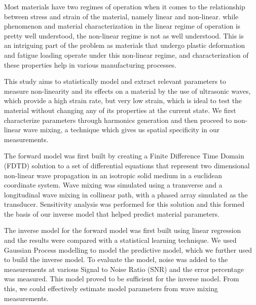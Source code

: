 Most materials have two regimes of operation when it comes to the relationship between stress and strain of the material, namely linear and non-linear. while phenomenon and material characterization in the linear regime of operation is pretty well understood, the non-linear regime is not as well understood. This is an intriguing part of the problem as materials that undergo plastic deformation and fatigue loading operate under this non-linear regime, and characterization of these properties help in various manufacturing processes.

This study aims to statistically model and extract relevant parameters to measure non-linearity and its effects on a material by the use of ultrasonic waves, which provide a high strain rate, but very low strain, which is ideal to test the material without changing any of its properties at the current state. We first characterize parameters through harmonics generation and then proceed to non-linear wave mixing, a technique which gives us spatial specificity in our measurements. 

The forward model was first built by creating a Finite Difference Time Domain (FDTD) solution to a set of differential equations that represent two dimensional non-linear wave propagation in an isotropic solid medium in a euclidean coordinate system. Wave mixing was simulated using a transverse and a longitudinal wave mixing in collinear path, with a phased array simulated as the transducer. Sensitivity analysis was performed for this solution and this formed the basis of our inverse model that helped predict material parameters.

The inverse model for the forward model was first built using linear regression and the results were compared with a statistical learning technique. We used Gaussian Process modelling to model the predictive model, which we further used to build the inverse model. To evaluate the model, noise was added to the measurements at various Signal to Noise Ratio (SNR) and the error percentage was measured. This model proved to be sufficient for the inverse model. From this, we could effectively estimate model parameters from wave mixing measurements.
